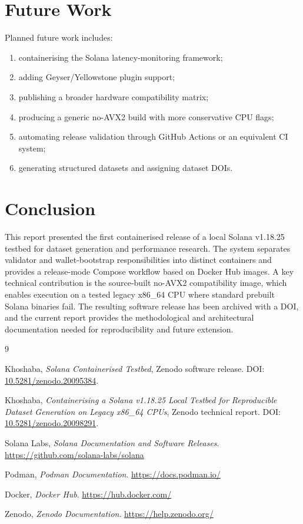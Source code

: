 \documentclass[11pt,a4paper]{article}
\begin{document}
\section{Future Work}

Planned future work includes:

\begin{enumerate}[leftmargin=2em]
  \item containerising the Solana latency-monitoring framework;
  \item adding Geyser/Yellowstone plugin support;
  \item publishing a broader hardware compatibility matrix;
  \item producing a generic no-AVX2 build with more conservative CPU flags;
  \item automating release validation through GitHub Actions or an equivalent CI system;
  \item generating structured datasets and assigning dataset DOIs.
\end{enumerate}

\section{Conclusion}

This report presented the first containerised release of a local Solana v1.18.25 testbed for dataset generation and performance research. The system separates validator and wallet-bootstrap responsibilities into distinct containers and provides a release-mode Compose workflow based on Docker Hub images. A key technical contribution is the source-built no-AVX2 compatibility image, which enables execution on a tested legacy x86\_64 CPU where standard prebuilt Solana binaries fail. The resulting software release has been archived with a DOI, and the current report provides the methodological and architectural documentation needed for reproducibility and future extension.

\begin{thebibliography}{9}

Khoshaba, \emph{Solana Containerised Testbed}, Zenodo software release.
DOI: \href{https://doi.org/10.5281/zenodo.20095384}{10.5281/zenodo.20095384}.

Khoshaba, \emph{Containerising a Solana v1.18.25 Local Testbed for Reproducible Dataset Generation on Legacy x86\_64 CPUs}, Zenodo technical report.
DOI: \href{https://doi.org/10.5281/zenodo.20098291}{10.5281/zenodo.20098291}.

Solana Labs, \emph{Solana Documentation and Software Releases}.
\url{https://github.com/solana-labs/solana}

Podman, \emph{Podman Documentation}.
\url{https://docs.podman.io/}

Docker, \emph{Docker Hub}.
\url{https://hub.docker.com/}

Zenodo, \emph{Zenodo Documentation}.
\url{https://help.zenodo.org/}

\end{thebibliography}
\end{document}
